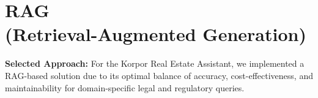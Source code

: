 \section*{RAG\\(Retrieval-Augmented Generation)}

\textbf{Selected Approach:} For the Korpor Real Estate Assistant, we implemented a RAG-based solution due to its optimal balance of accuracy, cost-effectiveness, and maintainability for domain-specific legal and regulatory queries.

\cleardoublepage
\pagestyle{empty} %
\renewcommand{\bibname}{Bibliography}

